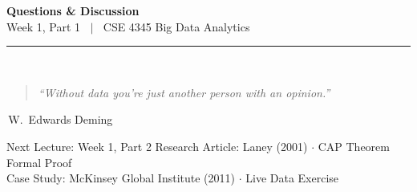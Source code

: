 \documentclass[aspectratio=169,10pt]{beamer}
\begin{document}
\begin{frame}[c]
  \begin{center}
    {\Large\bfseries Questions \& Discussion}\\[10pt]
    {\large Week 1, Part 1 $\;\mid\;$ CSE 4345 Big Data Analytics}\\[8pt]
    \textcolor{PUGray}{\rule{7cm}{0.5pt}}\\[10pt]
    \begin{quote}
    \itshape ``Without data you're just another person with an opinion.''
    \end{quote}
    \hfill\textemdash\,W.\ Edwards Deming
    \vspace{16pt}
    \begin{block}{\centering Next Lecture: Week 1, Part 2}
      \centering
      Research Article: Laney (2001) $\cdot$ CAP Theorem Formal Proof\\
      Case Study: McKinsey Global Institute (2011) $\cdot$ Live Data Exercise
    \end{block}
  \end{center}
\end{frame}

\end{document}
